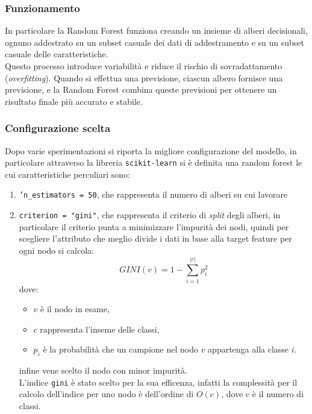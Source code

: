 \documentclass[italian,12pt,a4paper]{article}
\begin{document}
	\subsubsection{Funzionamento}
	In particolare la Random Forest funziona creando un insieme di alberi decisionali, ognuno addestrato su un subset casuale dei dati di addestramento e su un subset casuale delle caratteristiche.\\
	Questo processo introduce variabilità e riduce il rischio di sovradattamento (\textit{overfitting}). Quando si effettua una previsione, ciascun albero fornisce una previsione, e la Random Forest combina queste previsioni per ottenere un risultato finale più accurato e stabile.
	\subsubsection{Configurazione scelta}
	Dopo varie sperimentazioni si riporta la migliore configurazione del modello, in particolare attraverso la libreria \texttt{scikit-learn} \cite{scikit_learn} si è definita una random forest le cui caratteristiche perculiari sono:
		\begin{enumerate}
			\item \texttt{'n\_estimators = 50}, che rappresenta il numero di alberi su cui lavorare
			\item  \texttt{criterion = "gini"}, che rappresenta il criterio di \textit{split} degli alberi, in particolare il criterio punta a minimizzare l'impurità dei nodi, quindi per scegliere l'attributo che meglio divide i dati in base alla target feature per ogni nodo si calcola:
				$$GINI(v) = 1-\sum_{i = 1}^{|c|}p_i^2$$
			dove:
				\begin{itemize}
					\item $v$ è il nodo in esame,
					\item $c$ rappresenta l'inseme delle classi,
					\item $p_i$ è la probabilità che un campione nel nodo $v$ appartenga alla classe $i$.
				\end{itemize}
			infine vene scelto il nodo con minor impurità. \\
			\linebreak
			L'indice \texttt{gini} è stato scelto per la sua efficenza, infatti la complessità per il calcolo dell'indice per uno nodo è dell'ordine di $O(c)$, dove c è il numero di classi.
			
		\end{enumerate}
	
\end{document}
